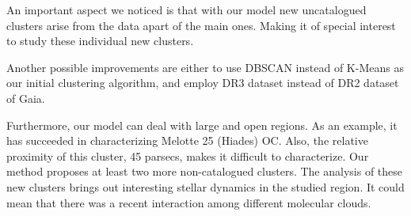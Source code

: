 \documentclass[11pt,a4paper,english,twocolumn]{article}
\begin{document}
An important aspect we noticed is that with our model new uncatalogued clusters arise from the data apart of the main ones. Making it of special interest to study these individual new clusters.

Another possible improvements are either to use DBSCAN instead of K-Means as our initial clustering algorithm, and employ DR3 dataset instead of DR2 dataset of Gaia.

Furthermore, our model can deal with large and open regions. As an example, it has succeeded in characterizing Melotte 25 (Hiades) OC. Also, the relative proximity of this cluster, 45 parsecs, makes it difficult to characterize. Our method proposes at least two more non-catalogued clusters. The analysis of these new clusters brings out interesting stellar dynamics in the studied region. It could mean that there was a recent interaction among different molecular clouds.

\renewcommand{\refname}{References}


\end{document}
